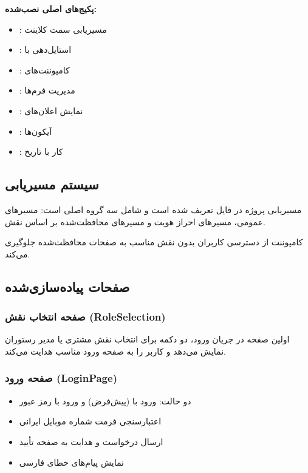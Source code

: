 \documentclass[12pt, a4paper]{article}
\begin{document}
\textbf{پکیج‌های اصلی نصب‌شده:}
\begin{itemize}[rightmargin=0.5cm]
  \item {}: مسیریابی سمت کلاینت
  \item {}: استایل‌دهی با 
  \item {}: کامپوننت‌های 
  \item {}: مدیریت فرم‌ها
  \item {}: نمایش اعلان‌های 
  \item {}: آیکون‌ها
  \item {}: کار با تاریخ
\end{itemize}

\subsection{سیستم مسیریابی}

مسیریابی پروژه در فایل \texttt{} تعریف شده است و شامل سه گروه اصلی است:
مسیرهای عمومی، مسیرهای احراز هویت و مسیرهای محافظت‌شده بر اساس نقش.

کامپوننت \texttt{} از دسترسی کاربران بدون نقش مناسب به صفحات محافظت‌شده
جلوگیری می‌کند.

\subsection{صفحات پیاده‌سازی‌شده}

\subsubsection{صفحه انتخاب نقش (RoleSelection)}
اولین صفحه در جریان ورود، دو دکمه برای انتخاب نقش مشتری یا مدیر رستوران نمایش می‌دهد
و کاربر را به صفحه ورود مناسب هدایت می‌کند.

\subsubsection{صفحه ورود (LoginPage)}
\begin{itemize}[rightmargin=0.5cm]
  \item دو حالت: ورود با  (پیش‌فرض) و ورود با رمز عبور
  \item اعتبارسنجی فرمت شماره موبایل ایرانی
  \item ارسال درخواست  و هدایت به صفحه تأیید
  \item نمایش پیام‌های خطای فارسی
\end{itemize}
\end{document}
